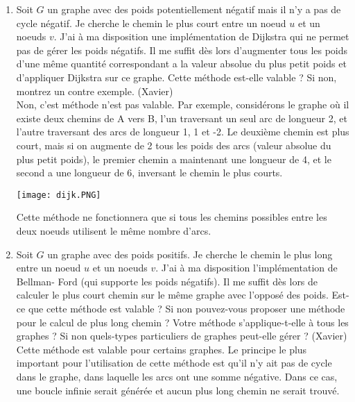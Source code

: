\documentclass[11pt]{article}
\begin{document}
\begin{enumerate}
\item Soit $G$ un graphe avec des poids potentiellement négatif mais il n’y a pas de
cycle négatif. Je cherche le chemin le plus court entre un noeud $u$ et un noeuds $v$.
J’ai à ma disposition une implémentation de Dijkstra qui ne permet pas de gérer
les poids négatifs. Il me suffit dès lors d’augmenter tous les poids d’une même
quantité correspondant a la valeur absolue du plus petit poids et d’appliquer
Dijkstra sur ce graphe. Cette méthode est-elle valable ? Si non, montrez un contre
exemple. (Xavier)\\

Non, c'est méthode n'est pas valable. Par exemple, considérons le graphe où il existe deux chemins de A vers B, l'un traversant un seul arc de longueur 2, et l'autre traversant des arcs de longueur 1, 1 et -2. Le deuxième chemin est plus court, mais si on augmente de 2 tous les poids des arcs (valeur absolue du plus petit poids), le premier chemin a maintenant une longueur de 4, et le second a une longueur de 6, inversant le chemin le plus courts.
\begin{center}
\texttt{[image: dijk.PNG]} 
\end{center}
Cette méthode ne fonctionnera que si tous les chemins possibles entre les deux noeuds utilisent le même nombre d'arcs.\\

\item Soit $G$ un graphe avec des poids positifs. Je cherche le chemin le plus long entre
un noeud $u$ et un noeuds $v$. J’ai à ma disposition l’implémentation de Bellman-
Ford (qui supporte les poids négatifs). Il me suffit dès lors de calculer le plus
court chemin sur le même graphe avec l’opposé des poids. Est-ce que cette méthode
est valable ? Si non pouvez-vous proposer une méthode pour le calcul de
plus long chemin ? Votre méthode s’applique-t-elle à tous les graphes ? Si non
quels-types particuliers de graphes peut-elle gérer ? (Xavier)\\

Cette méthode est valable pour certains graphes. Le principe le plus important pour l'utilisation de cette méthode est qu'il n'y ait pas de cycle dans le graphe, dans laquelle les arcs ont une somme négative. Dans ce cas, une boucle infinie serait générée et aucun plus long chemin ne serait trouvé.

\end{enumerate}
\end{document}
